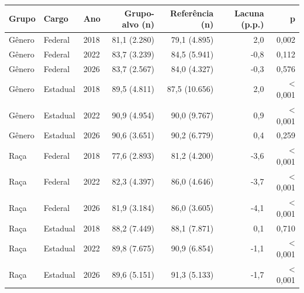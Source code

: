 \begin{tabular}{lllrrrr}
\toprule
Grupo & Cargo & Ano & Grupo-alvo (n) & Referência (n) & Lacuna (p.p.) & p \\
\midrule
Gênero & Federal & 2018 & 81,1 (2.280) & 79,1 (4.895) & 2,0 & 0,002 \\
Gênero & Federal & 2022 & 83,7 (3.239) & 84,5 (5.941) & -0,8 & 0,112 \\
Gênero & Federal & 2026 & 83,7 (2.567) & 84,0 (4.327) & -0,3 & 0,576 \\
Gênero & Estadual & 2018 & 89,5 (4.811) & 87,5 (10.656) & 2,0 & < 0,001 \\
Gênero & Estadual & 2022 & 90,9 (4.954) & 90,0 (9.767) & 0,9 & < 0,001 \\
Gênero & Estadual & 2026 & 90,6 (3.651) & 90,2 (6.779) & 0,4 & 0,259 \\
Raça & Federal & 2018 & 77,6 (2.893) & 81,2 (4.200) & -3,6 & < 0,001 \\
Raça & Federal & 2022 & 82,3 (4.397) & 86,0 (4.646) & -3,7 & < 0,001 \\
Raça & Federal & 2026 & 81,9 (3.184) & 86,0 (3.605) & -4,1 & < 0,001 \\
Raça & Estadual & 2018 & 88,2 (7.449) & 88,1 (7.871) & 0,1 & 0,710 \\
Raça & Estadual & 2022 & 89,8 (7.675) & 90,9 (6.854) & -1,1 & < 0,001 \\
Raça & Estadual & 2026 & 89,6 (5.151) & 91,3 (5.133) & -1,7 & < 0,001 \\
\bottomrule
\end{tabular}
